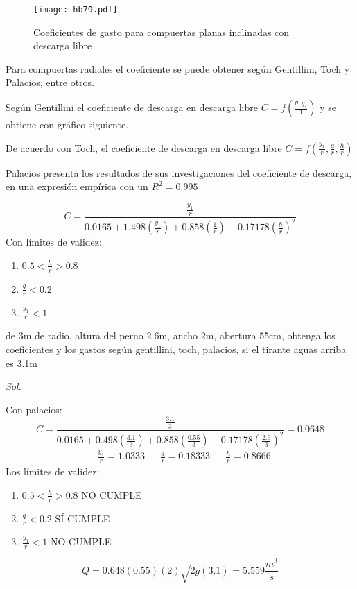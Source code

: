 \begin{figure}[h!]
\centering
  \texttt{[image: hb79.pdf]}
  \caption{Coeficientes de gasto para compuertas planas inclinadas con descarga libre}
  \label{hb79}
\end{figure}
Para compuertas radiales el coeficiente se puede obtener según Gentillini, Toch y Palacios, entre otros.

Según Gentillini el coeficiente de descarga en descarga libre $C=f\left( \frac{\theta,y_1}{1} \right)$ y se obtiene con gráfico siguiente.

De acuerdo con Toch, el coeficiente de descarga en descarga libre $C=f\left(\frac{y_1}{r}, \frac{a}{r}, \frac{h}{r}\right)$

Palacios presenta los resultados de sus investigaciones del coeficiente de descarga, en una expresión empírica con un $R^2=0.995$

\begin{equation}
    C = \frac{\frac{y_1}{r}}{0.0165 + 1.498\left( \frac{y_1}{r} \right) + 0.858\left( \frac{1}{r} \right) - 0.17178\left( \frac{h}{r} \right)^2}
\end{equation}
Con límites de validez:
\begin{enumerate}
    \item $0.5< \frac{h}{r}>0.8$
    \item $\frac{q}{r}<0.2$
    \item $\frac{y_1}{r}<1$
\end{enumerate}

\begin{problem}
    de 3m de radio, altura del perno 2.6m, ancho 2m, abertura 55cm, obtenga los coeficientes y los gastos según gentillini, toch, palacios, si el tirante aguas arriba es 3.1m
\end{problem}
\textit{ Sol. }

Con palacios:
\begin{equation*}
    C = \frac{\frac{3.1}{3}}{0.0165 +0.498\left(\frac{3.1}{3}\right) +0.858\left(\frac{0.55}{3}\right) -0.17178\left(\frac{2.6}{3}\right)^2}= 0.0648
\end{equation*}
\begin{align*}
    &\frac{y_1}{r} =1.0333&&\frac{a}{r} = 0.18333 && \frac{h}{r} = 0.8666
\end{align*}
Los límites de validez:
\begin{enumerate}
    \item $0.5< \frac{h}{r}>0.8$ NO CUMPLE
    \item $\frac{q}{r}<0.2$ SÍ CUMPLE
    \item $\frac{y_1}{r}<1$ NO CUMPLE
\end{enumerate}
\begin{equation*}
    Q = 0.648(0.55)(2)\sqrt{2g(3.1)} = 5.559 \frac{m^3}{s}
\end{equation*}

